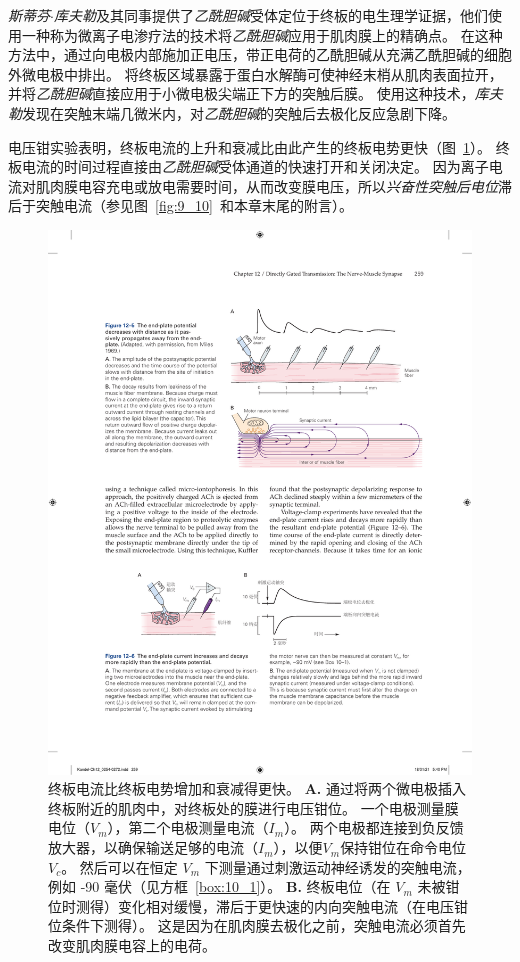 \textit{斯蒂芬$\cdot$库夫勒}及其同事提供了\textit{乙酰胆碱}受体定位于终板的电生理学证据，他们使用一种称为微离子电渗疗法的技术将\textit{乙酰胆碱}应用于肌肉膜上的精确点。
在这种方法中，通过向电极内部施加正电压，带正电荷的乙酰胆碱从充满乙酰胆碱的细胞外微电极中排出。
将终板区域暴露于蛋白水解酶可使神经末梢从肌肉表面拉开，并将\textit{乙酰胆碱}直接应用于小微电极尖端正下方的突触后膜。
使用这种技术，\textit{库夫勒}发现在突触末端几微米内，对\textit{乙酰胆碱}的突触后去极化反应急剧下降。


电压钳实验表明，终板电流的上升和衰减比由此产生的终板电势更快（图~\ref{fig:12_6}）。
终板电流的时间过程直接由\textit{乙酰胆碱}受体通道的快速打开和关闭决定。
因为离子电流对肌肉膜电容充电或放电需要时间，从而改变膜电压，所以\textit{兴奋性突触后电位}滞后于突触电流（参见图~\ref{fig:9_10}~和本章末尾的附言）。


\begin{figure}[htbp]
	\centering
	\includegraphics[width=1.0\linewidth]{chap12/fig_12_6}
	\caption{终板电流比终板电势增加和衰减得更快。
		\textbf{A.} 通过将两个微电极插入终板附近的肌肉中，对终板处的膜进行电压钳位。
		一个电极测量膜电位（$V_m$），第二个电极测量电流（$I_m$）。
		两个电极都连接到负反馈放大器，以确保输送足够的电流（$I_m$），以便$V_m$保持钳位在命令电位 $V_c$。
		然后可以在恒定 $V_m$ 下测量通过刺激运动神经诱发的突触电流，例如 -90 毫伏（见方框~\ref{box:10_1}）。
		\textbf{B.} 终板电位（在 $V_m$ 未被钳位时测得）变化相对缓慢，滞后于更快速的内向突触电流（在电压钳位条件下测得）。
		这是因为在肌肉膜去极化之前，突触电流必须首先改变肌肉膜电容上的电荷。}
	\label{fig:12_6}
\end{figure}



